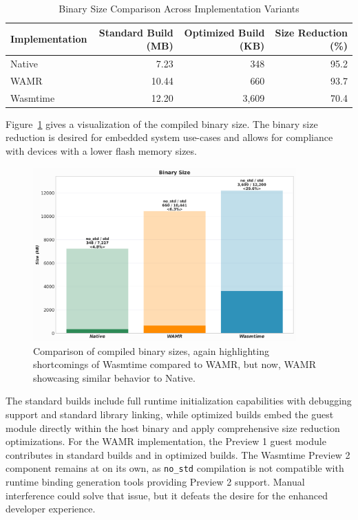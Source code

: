 \begin{table}[H]
    \centering
    \caption{Binary Size Comparison Across Implementation Variants}
    \label{tab:binary-sizes}
    \begin{tabular}{lrrr}
    \toprule
    \textbf{Implementation} & \textbf{Standard Build (MB)} & \textbf{Optimized Build (KB)} & \textbf{Size Reduction (\%)} \\
    \midrule
    Native              & 7.23  & 348   & 95.2 \\
    WAMR                & 10.44 & 660   & 93.7 \\
    Wasmtime            & 12.20 & 3,609 & 70.4 \\
    \bottomrule
    \end{tabular}
\end{table}

Figure~\ref{fig:bin_size_comp} gives a visualization of the compiled binary size. The binary size reduction is desired for embedded system use-cases and allows for compliance with devices with a lower flash memory sizes.

\begin{figure}[H]
    \centering
    \includegraphics[width=0.9\textwidth]{images/bin_size.png}
    \caption{Comparison of compiled binary sizes, again highlighting shortcomings of Wasmtime compared to WAMR, but now, WAMR showcasing similar behavior to Native.}
    \label{fig:bin_size_comp}
\end{figure}

The standard builds include full runtime initialization capabilities with debugging support and standard library linking, while optimized builds embed the guest module directly within the host binary and apply comprehensive size reduction optimizations. For the WAMR implementation, the Preview 1 guest module contributes  in standard builds and  in optimized builds. The Wasmtime Preview 2 component remains at  on its own, as \texttt{no\_std} compilation is not compatible with runtime binding generation tools providing Preview 2 support. Manual interference could solve that issue, but it defeats the desire for the enhanced developer experience.

